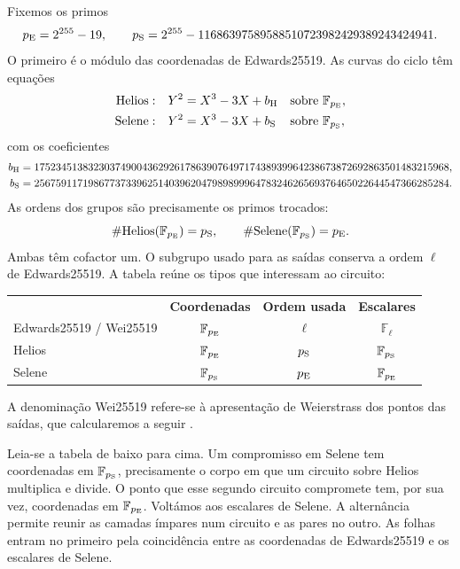 Fixemos os primos
\[
 p_{\rm E}=2^{255}-19,\qquad
 p_{\rm S}=2^{255}-11686397589588510723982429389243424941.
\]
O primeiro é o módulo das coordenadas de Edwards25519.
As curvas do ciclo têm equações
\[
 \begin{aligned}
 {\rm Helios}:&\quad Y^2=X^3-3X+b_{\rm H}
                     &&\text{sobre }\mathbb F_{p_{\rm E}},\\
 {\rm Selene}:&\quad Y^2=X^3-3X+b_{\rm S}
                     &&\text{sobre }\mathbb F_{p_{\rm S}},
 \end{aligned}
\]
com os coeficientes
\[
 \begin{aligned}
 b_{\rm H}&=17523451383230374900436292617863907649717438939964238673872692863501483215968,\\
 b_{\rm S}&=25675911719867737339625140396204798989996478324626569376465022644547366285284.
 \end{aligned}
\]
As ordens dos grupos são precisamente os primos trocados:
\[
 \# {\rm Helios}(\mathbb F_{p_{\rm E}})=p_{\rm S},
 \qquad
 \# {\rm Selene}(\mathbb F_{p_{\rm S}})=p_{\rm E}.
\]
Ambas têm cofactor um. O subgrupo usado para as saídas
conserva a ordem \(\ell\) de Edwards25519. A tabela reúne
os tipos que interessam ao circuito:
\begin{center}
\begin{tabular}{lccc}
 & \textbf{Coordenadas} & \textbf{Ordem usada} & \textbf{Escalares}\\[1mm]
Edwards25519 / Wei25519 & \(\mathbb F_{p_{\rm E}}\) & \(\ell\) & \(\mathbb F_\ell\)\\
Helios & \(\mathbb F_{p_{\rm E}}\) & \(p_{\rm S}\) & \(\mathbb F_{p_{\rm S}}\)\\
Selene & \(\mathbb F_{p_{\rm S}}\) & \(p_{\rm E}\) & \(\mathbb F_{p_{\rm E}}\)
\end{tabular}
\end{center}
A denominação Wei25519 refere-se à apresentação de Weierstrass
dos pontos das saídas, que calcularemos a seguir
\cite{monero-oxide-fcmp-source,helioselene-parameters}.

Leia-se a tabela de baixo para cima. Um compromisso em Selene
tem coordenadas em \(\mathbb F_{p_{\rm S}}\), precisamente o corpo
em que um circuito sobre Helios multiplica e divide. O ponto que
esse segundo circuito compromete tem, por sua vez, coordenadas em
\(\mathbb F_{p_{\rm E}}\). Voltámos aos escalares de Selene. A
alternância permite reunir as camadas ímpares num circuito e as
pares no outro. As folhas entram no primeiro pela coincidência
entre as coordenadas de Edwards25519 e os escalares de Selene.

